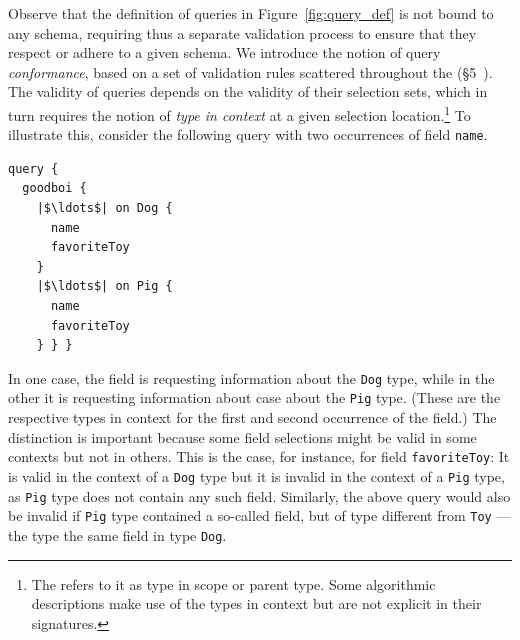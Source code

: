 Observe that the definition of queries in Figure~\ref{fig:query_def} is not bound to any schema, requiring thus a separate validation process to ensure that they respect or adhere to a given schema. We introduce the notion of query \textit{conformance}, based on a set of validation rules scattered throughout the \spec (\cf\S5~\cite{gqlspec}). The validity of queries depends on the validity of their selection sets, which in turn requires the notion of \textit{type in context} at a given selection location.\footnote{The \spec refers to it as type in scope or parent type. Some algorithmic descriptions make use of the types in context but are not explicit in their signatures.} %
To illustrate this, consider the following query with two occurrences of field \texttt{name}.

\begin{verbatim}
query {
  goodboi {
    |$\ldots$| on Dog {
      name
      favoriteToy
    }
    |$\ldots$| on Pig {
      name
      favoriteToy
    } } }
\end{verbatim}



\noindent In one case, the field is requesting information about the \texttt{Dog} type, while in the other it is requesting information about case about the \texttt{Pig} type. (These are the respective types in context for the first and second occurrence of the field.) The distinction is important because some field selections might be valid in some contexts but not in others. This is the case, for instance, for field \texttt{favoriteToy}: It is valid in the context of a \texttt{Dog} type but it is invalid in the context of a \texttt{Pig} type, as \texttt{Pig} type does not contain any such field. Similarly, the above query would also be invalid if \texttt{Pig} type contained a so-called field, but of type different from \texttt{Toy} ---the type the same field in type \texttt{Dog}.

